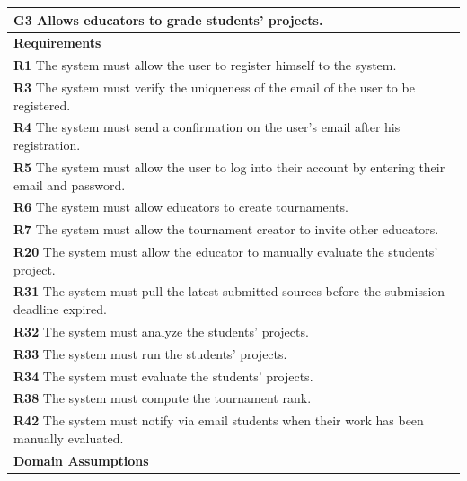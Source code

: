 \begin{table}[H]
    \begin{tabularx}{\textwidth}{X}
        \toprule
        \textbf{G3} Allows educators to grade students' projects.                                                    \\ \midrule
        \textbf{Requirements}                                                                                                        \\ \midrule
        \textbf{R1} The system must allow the user to register himself to the system.                                                     \\
        \textbf{R3} The system must verify the uniqueness of the email of the user to be registered.                                       \\ 
        \textbf{R4} The system must send a confirmation on the user's email after his registration.                         \\
        \textbf{R5} The system must allow the user to log into their account by entering their email and password.           \\
        \textbf{R6} The system must allow educators to create tournaments.              \\
        \textbf{R7} The system must allow the tournament creator to invite other educators.         \\  
        \textbf{R20} The system must allow the educator to manually evaluate the students' project.          \\ 
        \textbf{R31} The system must pull the latest submitted sources before the submission deadline expired.     \\ 
        \textbf{R32} The system must analyze the students' projects.      \\ 
        \textbf{R33} The system must run the students' projects.      \\
        \textbf{R34} The system must evaluate the students' projects.     \\ 
        \textbf{R38} The system must compute the tournament rank.                 \\ 
        \textbf{R42} The system must notify via email students when their work has been manually evaluated. \\
        \midrule
        \textbf{Domain Assumptions}                                                                                                  \\ \midrule

\end{tabularx}
\end{table}
